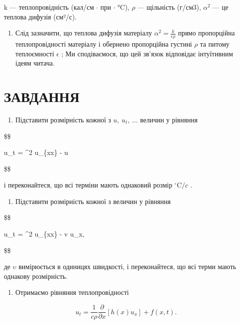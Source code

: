 \documentclass[
  ukrainian,
]{article}
\providecommand{\tightlist}{%
  \setlength{\itemsep}{0pt}\setlength{\parskip}{0pt}}
\begin{document}
k --- теплопровідність (кал/см \(\cdot\) при \(\cdot\) °C), \(\rho\) ---
щільність (г/см3), \(\alpha^2\) --- це теплова дифузія (см²/с).

\begin{enumerate}
\def\labelenumi{\arabic{enumi}.}
\setcounter{enumi}{3}
\tightlist
\item
  Слід зазначити, що теплова дифузія матеріалу
  \(\alpha^2 = \frac{k}{\epsilon \rho}\) прямо пропорційна
  теплопровідності матеріалу і обернено пропорційна густині \(\rho\) та
  питому теплоємності \(\epsilon\) ; Ми сподіваємося, що цей зв'язок
  відповідає інтуїтивним ідеям читача.
\end{enumerate}

\section{ЗАВДАННЯ}\label{ux437ux430ux432ux434ux430ux43dux43dux44f-3}

\begin{enumerate}
\def\labelenumi{\arabic{enumi}.}
\tightlist
\item
  Підставити розмірність кожної з \(u,\ u_t,\ \dots\) величин у рівняння
\end{enumerate}

\$\$

u\_t = \alpha\^{}2 u\_\{xx\} - \beta u

\$\$

і переконайтеся, що всі терміни мають однаковий розмір
\({}^{\circ}\mathrm{C}/c\) .

\begin{enumerate}
\def\labelenumi{\arabic{enumi}.}
\setcounter{enumi}{1}
\tightlist
\item
  Підставити розмірність кожної з величин у рівняння
\end{enumerate}

\$\$

u\_t = \alpha\^{}2 u\_\{xx\} - v u\_x,

\$\$

де \(\upsilon\) вимірюється в одиницях швидкості, і переконайтеся, що
всі терми мають однакову розмірність.

\begin{enumerate}
\def\labelenumi{\arabic{enumi}.}
\setcounter{enumi}{2}
\tightlist
\item
  Отримаємо рівняння теплопровідності
\end{enumerate}

\[
u_t = \frac{1}{c\rho}\frac{\partial}{\partial x}\left[h(x)u_x\right] + f(x,t).
\]
\end{document}

